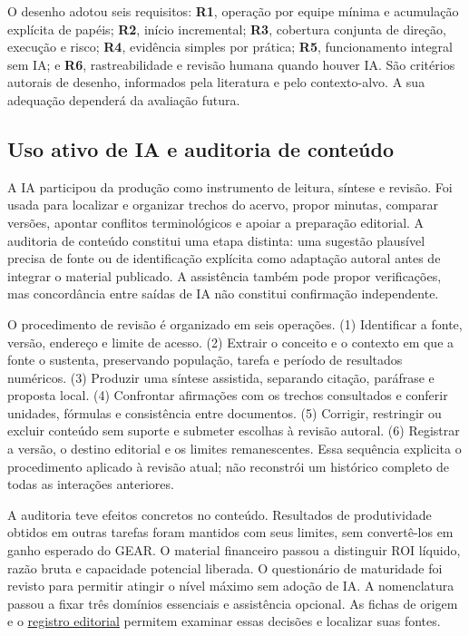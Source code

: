 O desenho adotou seis requisitos: \textbf{R1}, operação por equipe mínima e acumulação explícita de papéis; \textbf{R2}, início incremental; \textbf{R3}, cobertura conjunta de direção, execução e risco; \textbf{R4}, evidência simples por prática; \textbf{R5}, funcionamento integral sem IA; e \textbf{R6}, rastreabilidade e revisão humana quando houver IA. São critérios autorais de desenho, informados pela literatura e pelo contexto-alvo. A sua adequação dependerá da avaliação futura.

\subsection{Uso ativo de IA e auditoria de conteúdo}
\label{sec:auditoria-ia}

A IA participou da produção como instrumento de leitura, síntese e revisão. Foi usada para localizar e organizar trechos do acervo, propor minutas, comparar versões, apontar conflitos terminológicos e apoiar a preparação editorial. A auditoria de conteúdo constitui uma etapa distinta: uma sugestão plausível precisa de fonte ou de identificação explícita como adaptação autoral antes de integrar o material publicado. A assistência também pode propor verificações, mas concordância entre saídas de IA não constitui confirmação independente.

O procedimento de revisão é organizado em seis operações. (1) Identificar a fonte, versão, endereço e limite de acesso. (2) Extrair o conceito e o contexto em que a fonte o sustenta, preservando população, tarefa e período de resultados numéricos. (3) Produzir uma síntese assistida, separando citação, paráfrase e proposta local. (4) Confrontar afirmações com os trechos consultados e conferir unidades, fórmulas e consistência entre documentos. (5) Corrigir, restringir ou excluir conteúdo sem suporte e submeter escolhas à revisão autoral. (6) Registrar a versão, o destino editorial e os limites remanescentes. Essa sequência explicita o procedimento aplicado à revisão atual; não reconstrói um histórico completo de todas as interações anteriores.

A auditoria teve efeitos concretos no conteúdo. Resultados de produtividade obtidos em outras tarefas foram mantidos com seus limites, sem convertê-los em ganho esperado do GEAR. O material financeiro passou a distinguir ROI líquido, razão bruta e capacidade potencial liberada. O questionário de maturidade foi revisto para permitir atingir o nível máximo sem adoção de IA. A nomenclatura passou a fixar três domínios essenciais e assistência opcional. As fichas de origem e o \href{https://github.com/andrecodexvictor/GP-Pme/tree/codex/gear-editorial/framework/publicacao}{registro editorial} permitem examinar essas decisões e localizar suas fontes.

